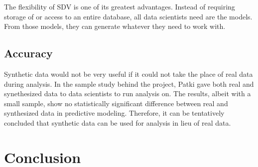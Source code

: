 
The flexibility of SDV is one of its greatest advantages. Instead of requiring storage of or access to an entire database, all data scientists need are the models. From those models, they can generate whatever they need to work with.

\subsection{Accuracy}

Synthetic data would not be very useful if it could not take the place of real data during analysis. In the sample study behind the project, Patki gave both real and synethesized data to data scientists to run analysis on. The results, albeit with a small sample, show no statistically significant difference between real and synthesized data in predictive modeling. Therefore, it can be tentatively concluded that synthetic data can be used for analysis in lieu of real data. \cite{}


\section{Conclusion}



